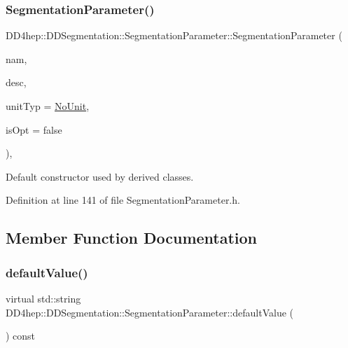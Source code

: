 \subsubsection{\texorpdfstring{Segmentation\+Parameter()}{SegmentationParameter()}}
{\footnotesize\ttfamily D\+D4hep\+::\+D\+D\+Segmentation\+::\+Segmentation\+Parameter\+::\+Segmentation\+Parameter (\begin{DoxyParamCaption}\item[{const std\+::string \&}]{nam,  }\item[{const std\+::string \&}]{desc,  }\item[{\hyperlink{class_d_d4hep_1_1_d_d_segmentation_1_1_segmentation_parameter_a36f5f8b8d812b2a2b81363377565d8d4}{Unit\+Type}}]{unit\+Typ = {\ttfamily \hyperlink{class_d_d4hep_1_1_d_d_segmentation_1_1_segmentation_parameter_a36f5f8b8d812b2a2b81363377565d8d4ab217a538e0ac077135786260a2221c14}{No\+Unit}},  }\item[{bool}]{is\+Opt = {\ttfamily false} }\end{DoxyParamCaption})\hspace{0.3cm}{\ttfamily [inline]}, {\ttfamily [protected]}}



Default constructor used by derived classes. 



Definition at line 141 of file Segmentation\+Parameter.\+h.



\subsection{Member Function Documentation}
\hypertarget{class_d_d4hep_1_1_d_d_segmentation_1_1_segmentation_parameter_a2ef4dee84f8c9172aca49908c8fff136}{}\label{class_d_d4hep_1_1_d_d_segmentation_1_1_segmentation_parameter_a2ef4dee84f8c9172aca49908c8fff136} 
\subsubsection{\texorpdfstring{default\+Value()}{defaultValue()}}
{\footnotesize\ttfamily virtual std\+::string D\+D4hep\+::\+D\+D\+Segmentation\+::\+Segmentation\+Parameter\+::default\+Value (\begin{DoxyParamCaption}{ }\end{DoxyParamCaption}) const\hspace{0.3cm}{\ttfamily [pure virtual]}}



